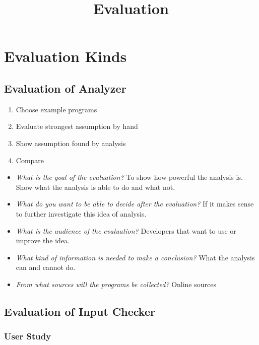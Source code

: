 \documentclass[11pt]{article}
\begin{document}
\title{Evaluation}

\maketitle


\section{Evaluation Kinds}

\subsection{Evaluation of Analyzer}

\begin{enumerate}
    \item Choose example programs
    \item Evaluate strongest assumption by hand
    \item Show assumption found by analysis
    \item Compare
\end{enumerate}

\begin{itemize}
  \item \textit{What is the goal of the evaluation?} To show how powerful the analysis is. Show what the analysis is able to do and what not.
  \item \textit{What do you want to be able to decide after the evaluation?} If it makes sense to further investigate this idea of analysis.
  \item \textit{What is the audience of the evaluation?} Developers that want to use or improve the idea.
  \item \textit{What kind of information is needed to make a conclusion?} What the analysis can and cannot do.
  \item \textit{From what sources will the programs be collected?} Online sources
\end{itemize}

\subsection{Evaluation of Input Checker}

\subsubsection{User Study}
\end{document}
